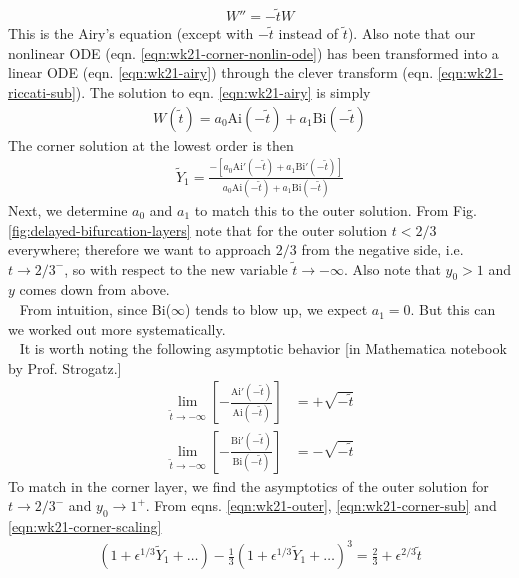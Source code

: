 \begin{gather}
	W'' = -\tilde{t} W \label{eqn:wk21-airy}
\end{gather}
This is the Airy's equation (except with $-\tilde{t}$ instead of $\tilde{t}$). Also note that our nonlinear ODE (eqn. \ref{eqn:wk21-corner-nonlin-ode}) has been transformed into a linear ODE (eqn. \ref{eqn:wk21-airy}) through the clever transform (eqn. \ref{eqn:wk21-riccati-sub}). The solution to eqn. \ref{eqn:wk21-airy} is simply
\begin{gather*}
	W(\tilde{t}) = a_0 \mathrm{Ai}(-\tilde{t}) + a_1 \mathrm{Bi}(-\tilde{t})
\end{gather*}
The corner solution at the lowest order is then
\begin{gather*}
	\tilde{Y}_1 = \frac{-[a_0 \mathrm{Ai}'(-\tilde{t}) + a_1 \mathrm{Bi}'(-\tilde{t})]}{a_0 \mathrm{Ai}(-\tilde{t}) + a_1 \mathrm{Bi}(-\tilde{t})}
\end{gather*}
Next, we determine $a_0$ and $a_1$ to match this to the outer solution. From Fig. \ref{fig:delayed-bifurcation-layers} note that for the outer solution $t<2/3$ everywhere; therefore we want to approach $2/3$ from the negative side, i.e. $t \rightarrow 2/3^-$, so with respect to the new variable $\tilde{t} \rightarrow -\infty$. Also note that $y_0 >1$ and $y$ comes down from above. \\
\ \newline
From intuition, since Bi($\infty$) tends to blow up, we expect $a_1=0$. But this can we worked out more systematically.  \\ 
\ \newline
It is worth noting the following asymptotic behavior {\color{red}[in Mathematica notebook by Prof. Strogatz.]}
\begin{align*}
	\lim\limits_{\tilde{t} \rightarrow -\infty} \left[-\frac{\mathrm{Ai}'(-\tilde{t})}{\mathrm{Ai}(-\tilde{t})}\right] &=+ \sqrt{-\tilde{t}} \\
	\lim\limits_{\tilde{t} \rightarrow -\infty} \left[-\frac{\mathrm{Bi}'(-\tilde{t})}{\mathrm{Bi}(-\tilde{t})}\right] &=- \sqrt{-\tilde{t}}
\end{align*}
To match in the corner layer, we find the asymptotics of the outer solution for $t\rightarrow 2/3^-$ and $y_0 \rightarrow 1^+$. From eqns. \ref{eqn:wk21-outer}, \ref{eqn:wk21-corner-sub} and \ref{eqn:wk21-corner-scaling}
\begin{align*}
	\left(1 + \epsilon^{1/3} \tilde{Y}_1 + \dots \right) - \frac{1}{3}\left(1 + \epsilon^{1/3} \tilde{Y}_1 + \dots\right)^3 = \frac{2}{3} + \epsilon^{2/3} \tilde{t}
\end{align*}
